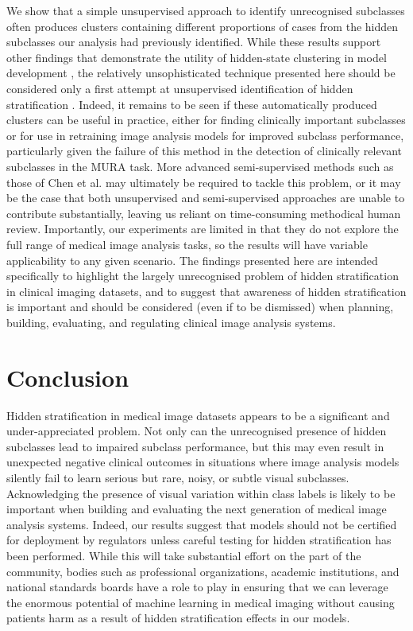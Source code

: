 \documentclass{article}
\begin{document}
We show that a simple unsupervised approach to identify unrecognised subclasses often produces clusters containing different proportions of cases from the hidden subclasses our analysis had previously identified. 
While these results support other findings that demonstrate the utility of hidden-state clustering in model development \citep{Liu2019-qt}, the relatively unsophisticated technique presented here should be considered only a first attempt at unsupervised identification of hidden stratification \citep{calinski1974dendrite, rousseeuw1987silhouettes}. 
Indeed, it remains to be seen if these automatically produced clusters can be useful in practice, either for finding clinically important subclasses or for use in retraining image analysis models for improved subclass performance, particularly given the failure of this method in the detection of clinically relevant subclasses in the MURA task. 
More advanced semi-supervised methods such as those of Chen et al. \citep{chen2019slicing} may ultimately be required to tackle this problem, or it may be the case that both unsupervised and semi-supervised approaches are unable to contribute substantially, leaving us reliant on time-consuming methodical human review.
Importantly, our experiments are limited in that they do not explore the full range of medical image analysis tasks, so the results will have variable applicability to any given scenario.
The findings presented here are intended specifically to highlight the largely unrecognised problem of hidden stratification in clinical imaging datasets, and to suggest that awareness of hidden stratification is important and should be considered (even if to be dismissed) when planning, building, evaluating, and regulating clinical image analysis systems.
 
\section{Conclusion}

Hidden stratification in medical image datasets appears to be a significant and under-appreciated problem. 
Not only can the unrecognised presence of hidden subclasses lead to impaired subclass performance, but this may even result in unexpected negative clinical outcomes in situations where image analysis models silently fail to learn serious but rare, noisy, or subtle visual subclasses.
Acknowledging the presence of visual variation within class labels is likely to be important when building and evaluating the next generation of medical image analysis systems.
Indeed, our results suggest that models should not be certified for deployment by regulators unless careful testing for hidden stratification has been performed.
While this will take substantial effort on the part of the community, bodies such as professional organizations, academic institutions, and national standards boards have a role to play in ensuring that we can leverage the enormous potential of machine learning in medical imaging without causing patients harm as a result of hidden stratification effects in our models.




\end{document}
